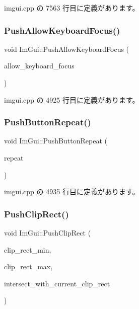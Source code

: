  imgui.\+cpp の 7563 行目に定義があります。

\mbox{\label{namespace_im_gui_adf7c3cfdcbb06617bb70ff1526d064f4}} 
\subsubsection{\texorpdfstring{Push\+Allow\+Keyboard\+Focus()}{PushAllowKeyboardFocus()}}
{\footnotesize\ttfamily void Im\+Gui\+::\+Push\+Allow\+Keyboard\+Focus (\begin{DoxyParamCaption}\item[{bool}]{allow\+\_\+keyboard\+\_\+focus }\end{DoxyParamCaption})}



 imgui.\+cpp の 4925 行目に定義があります。

\mbox{\label{namespace_im_gui_a61d3e0191d67bedaf45f0178f87e3125}} 
\subsubsection{\texorpdfstring{Push\+Button\+Repeat()}{PushButtonRepeat()}}
{\footnotesize\ttfamily void Im\+Gui\+::\+Push\+Button\+Repeat (\begin{DoxyParamCaption}\item[{bool}]{repeat }\end{DoxyParamCaption})}



 imgui.\+cpp の 4935 行目に定義があります。

\mbox{\label{namespace_im_gui_a11c8bd8676e1281e15b24c9615b6904a}} 
\subsubsection{\texorpdfstring{Push\+Clip\+Rect()}{PushClipRect()}}
{\footnotesize\ttfamily void Im\+Gui\+::\+Push\+Clip\+Rect (\begin{DoxyParamCaption}\item[{const \mbox{\hyperlink{struct_im_vec2}{Im\+Vec2}} \&}]{clip\+\_\+rect\+\_\+min,  }\item[{const \mbox{\hyperlink{struct_im_vec2}{Im\+Vec2}} \&}]{clip\+\_\+rect\+\_\+max,  }\item[{bool}]{intersect\+\_\+with\+\_\+current\+\_\+clip\+\_\+rect }\end{DoxyParamCaption})}



